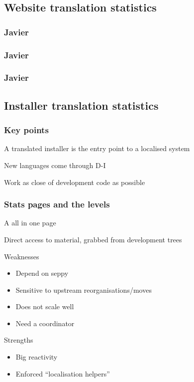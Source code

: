\documentclass{beamer}
\begin{document}

\subsection{Website translation statistics}

\begin{frame}
  \frametitle{Javier}
\end{frame}

\begin{frame}
  \frametitle{Javier}
\end{frame}

\begin{frame}
  \frametitle{Javier}
\end{frame}

\subsection{Installer translation statistics}

\begin{frame}
  \frametitle{Key points}
	\begin{block}
		{A translated installer is the entry point to a localised system}
	\end{block}
	\begin{block}
		{New languages come through D-I}
	\end{block}
	\begin{block}
		{Work as close of development code as possible}
	\end{block}
\end{frame}

\begin{frame}
  \frametitle{Stats pages and the levels}
	\begin{block}
		{A all in one page}
	\end{block}
	\begin{block}
		{Direct access to material, grabbed from development trees}
	\end{block}
	\begin{block}
		{Weaknesses}
		\begin{itemize}
		\item
			Depend on seppy
		\item
			Sensitive to upstream reorganisations/moves
		\item
			Does not scale well
		\item
			Need a coordinator
		\end{itemize}
	\end{block}
	\begin{block}
		{Strengths}
		\begin{itemize}
		\item
			Big reactivity
		\item
			Enforced ``localisation helpers''
		\end{itemize}
	\end{block}
\end{frame}
\end{document}
